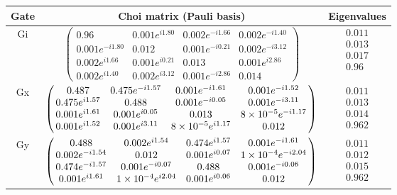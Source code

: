 {\begin{table}[h]
\begin{center}
\begin{tabular}[l]{|c|c|c|}
\hline
Gate & Choi matrix (Pauli basis) & Eigenvalues \\ \hline
Gi & $ \left(\!\!\begin{array}{cccc}
0.96 & 0.001e^{i1.80} & 0.002e^{-i1.66} & 0.002e^{-i1.40} \\ 
0.001e^{-i1.80} & 0.012 & 0.001e^{-i0.21} & 0.002e^{-i3.12} \\ 
0.002e^{i1.66} & 0.001e^{i0.21} & 0.013 & 0.001e^{i2.86} \\ 
0.002e^{i1.40} & 0.002e^{i3.12} & 0.001e^{-i2.86} & 0.014
 \end{array}\!\!\right) $
 & $ \begin{array}{c}
0.011 \\ 
0.013 \\ 
0.017 \\ 
0.96
 \end{array} $
 \\ \hline
Gx & $ \left(\!\!\begin{array}{cccc}
0.487 & 0.475e^{-i1.57} & 0.001e^{-i1.61} & 0.001e^{-i1.52} \\ 
0.475e^{i1.57} & 0.488 & 0.001e^{-i0.05} & 0.001e^{-i3.11} \\ 
0.001e^{i1.61} & 0.001e^{i0.05} & 0.013 & 8\times 10^{-5}e^{-i1.17} \\ 
0.001e^{i1.52} & 0.001e^{i3.11} & 8\times 10^{-5}e^{i1.17} & 0.012
 \end{array}\!\!\right) $
 & $ \begin{array}{c}
0.011 \\ 
0.013 \\ 
0.014 \\ 
0.962
 \end{array} $
 \\ \hline
Gy & $ \left(\!\!\begin{array}{cccc}
0.488 & 0.002e^{i1.54} & 0.474e^{i1.57} & 0.001e^{-i1.61} \\ 
0.002e^{-i1.54} & 0.012 & 0.001e^{i0.07} & 1\times 10^{-4}e^{-i2.04} \\ 
0.474e^{-i1.57} & 0.001e^{-i0.07} & 0.488 & 0.001e^{-i0.06} \\ 
0.001e^{i1.61} & 1\times 10^{-4}e^{i2.04} & 0.001e^{i0.06} & 0.012
 \end{array}\!\!\right) $
 & $ \begin{array}{c}
0.011 \\ 
0.012 \\ 
0.015 \\ 
0.962
 \end{array} $
 \\ \hline
\end{tabular}


\end{center}
\end{table}}
